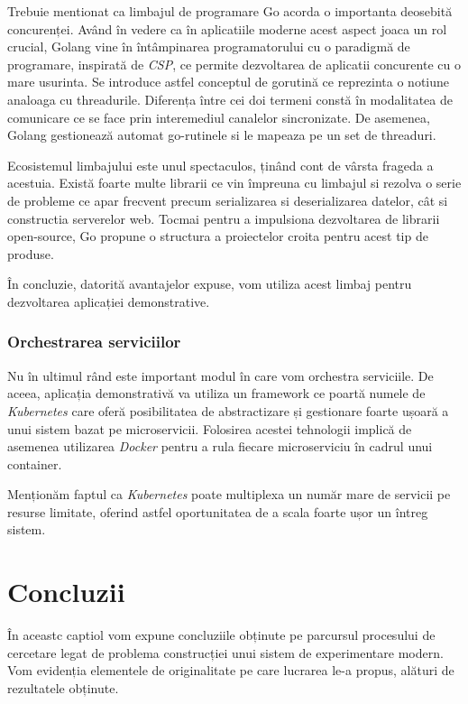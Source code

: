 Trebuie mentionat ca limbajul de programare Go acorda o importanta deosebită concurenței. Având în vedere ca în aplicatiile moderne acest aspect joaca un rol crucial,
Golang vine în întâmpinarea programatorului cu o paradigmă de programare, inspirată de \textit{CSP}\cite{hoare_csp}, ce permite
dezvoltarea de aplicatii concurente cu o mare usurinta. Se introduce astfel conceptul de gorutină
ce reprezinta o notiune analoaga cu threadurile. Diferența între cei doi termeni constă în modalitatea de comunicare ce se face prin interemediul canalelor sincronizate. De asemenea, Golang gestionează automat go-rutinele si le mapeaza pe un set de threaduri.

Ecosistemul limbajului este unul spectaculos, ținând cont de vârsta frageda a acestuia. Există foarte multe librarii ce vin împreuna cu limbajul si rezolva o serie de probleme
ce apar frecvent precum serializarea si deserializarea datelor, cât si constructia serverelor web. Tocmai pentru a impulsiona dezvoltarea de librarii open-source, Go propune o structura a proiectelor croita pentru acest tip de produse.

În concluzie, datorită avantajelor expuse, vom utiliza acest limbaj pentru dezvoltarea aplicației demonstrative.

\subsection{Orchestrarea serviciilor}

Nu în ultimul rând este important modul în care vom orchestra serviciile. De aceea, aplicația demonstrativă va utiliza un framework ce poartă numele de \textit{Kubernetes} care oferă posibilitatea de abstractizare și gestionare foarte ușoară a unui sistem bazat pe microservicii. Folosirea acestei tehnologii implică de asemenea utilizarea \textit{Docker} pentru a rula fiecare microserviciu în cadrul unui container. 

Menționăm faptul ca \textit{Kubernetes} poate multiplexa un număr mare de servicii pe resurse limitate, oferind astfel oportunitatea de a scala foarte ușor un întreg sistem.

\chapter{Concluzii}

În aceastc captiol vom expune concluziile obținute pe parcursul procesului de cercetare legat de problema construcției unui sistem de experimentare modern. Vom evidenția elementele de originalitate pe care lucrarea le-a propus, alături de rezultatele obținute. 

